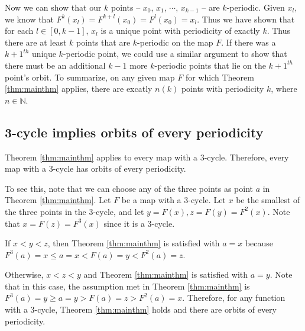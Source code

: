 \documentclass[12pt]{IEEEtran}
\begin{document}
Now we can show that our $k$ points -- $x_0$, $x_1$, $\cdots$, $x_{k-1}$ -- are $k$-periodic. Given $x_l$, we know that $F^k \left( x_l \right) = F^{k+l} \left ( x_0 \right) = F^{l} \left ( x_0 \right) = x_l$. Thus we have shown that for each $l \in [0,k-1]$, $x_l$ is a unique point with periodicity of exactly $k$. Thus there are at least $k$ points that are $k$-periodic on the map $F$. If there was a $k+1^{th}$ unique $k$-periodic point, we could use a similar argument to show that there must be an additional $k-1$ more $k$-periodic points that lie on the $k+1^{th}$ point's orbit. To summarize, on any given map $F$ for which Theorem \ref{thm:mainthm} applies, there are excatly $n \left( k \right)$ points with periodicity $k$, where $n \in \mathbb{N}$.



\subsection{ 3-cycle implies orbits of every periodicity}
Theorem \ref{thm:mainthm} applies to every map with a 3-cycle. Therefore, every map with a 3-cycle has orbits of every periodicity.

To see this, note that we can choose any of the three points as point $a$ in Theorem \ref{thm:mainthm}. Let $F$ be a map with a 3-cycle. Let $x$ be the smallest of the three points in the 3-cycle, and let $y = F \left( x \right), z = F \left( y \right) = F^2 \left( x \right)$. Note that $x = F \left( z \right) = F^3 \left( x \right)$ since it is a 3-cycle.

If $ x < y < z$, then Theorem \ref{thm:mainthm} is satisfied with $a=x$ because $F^3\left(a\right)=x \leq a=x < F\left(a\right)=y < F^2\left(a\right)=z$.

Otherwise, $x < z < y$ and Theorem \ref{thm:mainthm} is satisfied with $a=y$. Note that in this case, the assumption met in Theorem \ref{thm:mainthm} is $F^3\left(a\right)=y \geq a=y > F\left(a\right)=z > F^2\left(a\right)=x$. Therefore, for any function with a 3-cycle, Theorem \ref{thm:mainthm} holds and there are orbits of every periodicity.
\end{document}
